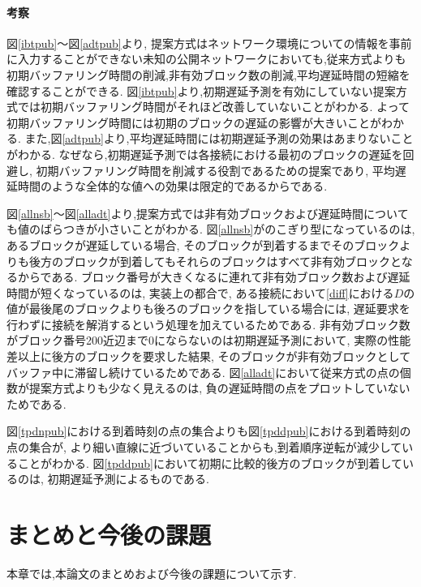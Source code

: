 \documentclass[a4j,12pt]{gradthesis_utf8}
\begin{document}
\clearpage

\subsubsection{考察}
図\ref{ibtpub}〜図\ref{adtpub}より,
提案方式はネットワーク環境についての情報を事前に入力することができない未知の公開ネットワークにおいても,従来方式よりも初期バッファリング時間の削減,非有効ブロック数の削減,平均遅延時間の短縮を確認することができる.
図\ref{ibtpub}より,初期遅延予測を有効にしていない提案方式では初期バッファリング時間がそれほど改善していないことがわかる.
よって初期バッファリング時間には初期のブロックの遅延の影響が大きいことがわかる.
また,図\ref{adtpub}より,平均遅延時間には初期遅延予測の効果はあまりないことがわかる.
なぜなら,初期遅延予測では各接続における最初のブロックの遅延を回避し,
初期バッファリング時間を削減する役割であるための提案であり,
平均遅延時間のような全体的な値への効果は限定的であるからである.

図\ref{allnsb}〜図\ref{alladt}より,提案方式では非有効ブロックおよび遅延時間についても値のばらつきが小さいことがわかる.
図\ref{allnsb}がのこぎり型になっているのは,あるブロックが遅延している場合,
そのブロックが到着するまでそのブロックよりも後方のブロックが到着してもそれらのブロックはすべて非有効ブロックとなるからである.
ブロック番号が大きくなるに連れて非有効ブロック数および遅延時間が短くなっているのは,
実装上の都合で,
ある接続において\ref{diff}における\begin{math}D\end{math}の値が最後尾のブロックよりも後ろのブロックを指している場合には,
遅延要求を行わずに接続を解消するという処理を加えているためである.
非有効ブロック数がブロック番号200近辺まで0にならないのは初期遅延予測において,
実際の性能差以上に後方のブロックを要求した結果,
そのブロックが非有効ブロックとしてバッファ中に滞留し続けているためである.
図\ref{alladt}において従来方式の点の個数が提案方式よりも少なく見えるのは,
負の遅延時間の点をプロットしていないためである.

図\ref{tpdnpub}における到着時刻の点の集合よりも図\ref{tpddpub}における到着時刻の点の集合が,
より細い直線に近づいていることからも,到着順序逆転が減少していることがわかる.
図\ref{tpddpub}において初期に比較的後方のブロックが到着しているのは,
初期遅延予測によるものである.
 
\chapter{まとめと今後の課題}\label{matomekongo}
本章では,本論文のまとめおよび今後の課題について示す.
\end{document}
